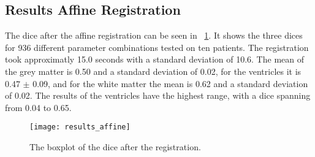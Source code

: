 \subsection{Results Affine Registration}
The dice after the affine registration can be seen in ~\ref{fig:result_affine}. It shows the three dices for 936 different parameter combinations tested on ten patients. The registration took approximatly 15.0 seconds with a standard deviation of 10.6. The mean of the grey matter is 0.50 and a standard deviation of 0.02, for the ventricles it is 0.47 $\pm$ 0.09, and for the white matter the mean is 0.62 and a standard deviation of 0.02. The results of the ventricles have the highest range, with a dice spanning from 0.04 to 0.65.

\begin{figure}[!h]
	\centering
	\texttt{[image: results\_affine]}
	\caption{The boxplot of the dice after the registration.}
	\label{fig:result_affine}
\end{figure}